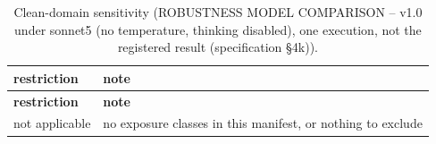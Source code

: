 \begingroup\footnotesize
\begin{longtable}{>{\raggedright\arraybackslash}p{126.4pt}>{\raggedright\arraybackslash}p{304.6pt}}
\caption{Clean-domain sensitivity (ROBUSTNESS MODEL COMPARISON -- v1.0 under sonnet5 (no temperature, thinking disabled), one execution, not the registered result (specification §4k)).} \\
\toprule
\textbf{restriction} & \textbf{note} \\
\midrule
\endfirsthead
\toprule
\textbf{restriction} & \textbf{note} \\
\midrule
\endhead
\bottomrule
\endfoot
not applicable & no exposure classes in this manifest, or nothing to exclude \\
\end{longtable}
\endgroup
